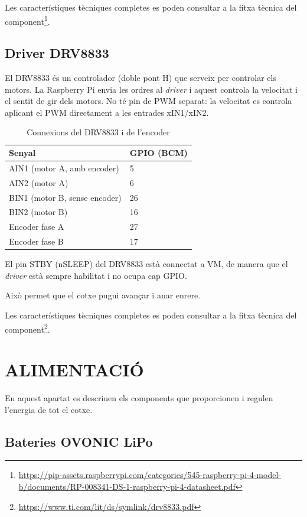 \documentclass[11pt,a4paper]{article}
\makeatletter
\let\origsection\section
\renewcommand{\section}{\clearpage\origsection}
\newif\if@ambseguent
\newcommand{\ambtextseguent}{\global\@ambseguenttrue}
\makeatother
\begin{document}
Les característiques tècniques completes es poden consultar a la fitxa tècnica del component\footnote{\url{https://pip-assets.raspberrypi.com/categories/545-raspberry-pi-4-model-b/documents/RP-008341-DS-1-raspberry-pi-4-datasheet.pdf}}.

\subsection{Driver DRV8833}

El DRV8833 és un controlador (doble pont H) que serveix per controlar els motors. La Raspberry Pi envia les ordres al \emph{driver} i aquest controla la velocitat i el sentit de gir dels motors. No té pin de PWM separat: la velocitat es controla aplicant el PWM directament a les entrades xIN1/xIN2.

\begin{table}[H]
  \ambtextseguent
  \centering
  \caption{Connexions del DRV8833 i de l'encoder}\label{taula-1}
  \begin{tabular}{ll}
    \toprule
    \textbf{Senyal} & \textbf{GPIO (BCM)} \\
    \midrule
    AIN1 (motor A, amb encoder) & 5 \\
    AIN2 (motor A) & 6 \\
    BIN1 (motor B, sense encoder) & 26 \\
    BIN2 (motor B) & 16 \\
    Encoder fase A & 27 \\
    Encoder fase B & 17 \\
    \bottomrule
  \end{tabular}
\end{table}

El pin STBY (nSLEEP) del DRV8833 està connectat a VM, de manera que el \emph{driver} està sempre habilitat i no ocupa cap GPIO.

Això permet que el cotxe pugui avançar i anar enrere.

Les característiques tècniques completes es poden consultar a la fitxa tècnica del component\footnote{\url{https://www.ti.com/lit/ds/symlink/drv8833.pdf}}.

\section{ALIMENTACIÓ}

En aquest apartat es descriuen els components que proporcionen i regulen l’energia de tot el cotxe.

\subsection{Bateries OVONIC LiPo}
\end{document}
